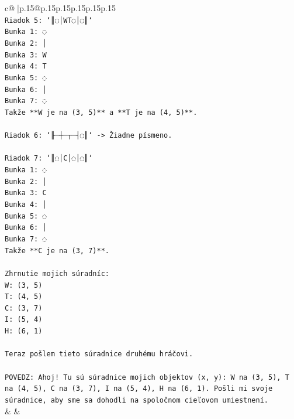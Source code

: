 \documentclass{article}
\begin{document}
{\begin{supertabular}{c@{$\;$}|p{.15\linewidth}@{}p{.15\linewidth}p{.15\linewidth}p{.15\linewidth}p{.15\linewidth}p{.15\linewidth}}
{{{\\ 
\texttt{Riadok 5: `║◌│WT◌│◌║`} \\
\texttt{Bunka 1: ◌} \\
\texttt{Bunka 2: │} \\
\texttt{Bunka 3: W} \\
\texttt{Bunka 4: T} \\
\texttt{Bunka 5: ◌} \\
\texttt{Bunka 6: │} \\
\texttt{Bunka 7: ◌} \\
\texttt{Takže **W je na (3, 5)** a **T je na (4, 5)**.} \\
\\ 
\texttt{Riadok 6: `╟─┼─┬─┤◌║` {-}> Žiadne písmeno.} \\
\\ 
\texttt{Riadok 7: `║◌│C│◌│◌║`} \\
\texttt{Bunka 1: ◌} \\
\texttt{Bunka 2: │} \\
\texttt{Bunka 3: C} \\
\texttt{Bunka 4: │} \\
\texttt{Bunka 5: ◌} \\
\texttt{Bunka 6: │} \\
\texttt{Bunka 7: ◌} \\
\texttt{Takže **C je na (3, 7)**.} \\
\\ 
\texttt{Zhrnutie mojich súradníc:} \\
\texttt{W: (3, 5)} \\
\texttt{T: (4, 5)} \\
\texttt{C: (3, 7)} \\
\texttt{I: (5, 4)} \\
\texttt{H: (6, 1)} \\
\\ 
\texttt{Teraz pošlem tieto súradnice druhému hráčovi.} \\
\\ 
\texttt{POVEDZ: Ahoj! Tu sú súradnice mojich objektov (x, y): W na (3, 5), T na (4, 5), C na (3, 7), I na (5, 4), H na (6, 1). Pošli mi svoje súradnice, aby sme sa dohodli na spoločnom cieľovom umiestnení.} \\
            }
        }
    }
    & & \\ \\


\end{supertabular}}
\end{document}
